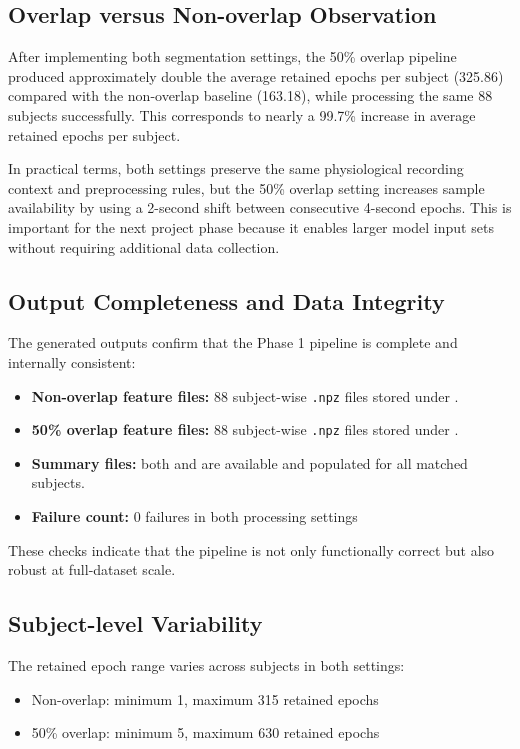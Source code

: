 \documentclass[12pt,a4paper]{article}
\begin{document}
\subsection{Overlap versus Non-overlap Observation}
After implementing both segmentation settings, the 50\% overlap pipeline produced approximately double the average retained epochs per subject (325.86) compared with the non-overlap baseline (163.18), while processing the same 88 subjects successfully. This corresponds to nearly a 99.7\% increase in average retained epochs per subject.

In practical terms, both settings preserve the same physiological recording context and preprocessing rules, but the 50\% overlap setting increases sample availability by using a 2-second shift between consecutive 4-second epochs. This is important for the next project phase because it enables larger model input sets without requiring additional data collection.

\subsection{Output Completeness and Data Integrity}
The generated outputs confirm that the Phase 1 pipeline is complete and internally consistent:
\begin{itemize}
    \item \textbf{Non-overlap feature files:} 88 subject-wise \texttt{.npz} files stored under
    .
    \item \textbf{50\% overlap feature files:} 88 subject-wise \texttt{.npz} files stored under
    .
    \item \textbf{Summary files:} both
     and
    are available and populated for all matched subjects.
    \item \textbf{Failure count:} 0 failures in both processing settings
\end{itemize}

These checks indicate that the pipeline is not only functionally correct but also robust at full-dataset scale.

\subsection{Subject-level Variability}
The retained epoch range varies across subjects in both settings:
\begin{itemize}
    \item Non-overlap: minimum 1, maximum 315 retained epochs
    \item 50\% overlap: minimum 5, maximum 630 retained epochs
\end{itemize}
\end{document}
